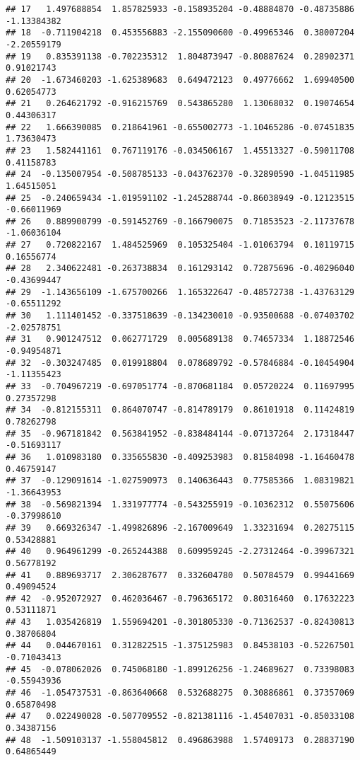 \documentclass[
]{article}
\begin{document}
\begin{verbatim}
## 17   1.497688854  1.857825933 -0.158935204 -0.48884870 -0.48735886 -1.13384382
## 18  -0.711904218  0.453556883 -2.155090600 -0.49965346  0.38007204 -2.20559179
## 19   0.835391138 -0.702235312  1.804873947 -0.80887624  0.28902371  0.91021743
## 20  -1.673460203 -1.625389683  0.649472123  0.49776662  1.69940500  0.62054773
## 21   0.264621792 -0.916215769  0.543865280  1.13068032  0.19074654  0.44306317
## 22   1.666390085  0.218641961 -0.655002773 -1.10465286 -0.07451835  1.73630473
## 23   1.582441161  0.767119176 -0.034506167  1.45513327 -0.59011708  0.41158783
## 24  -0.135007954 -0.508785133 -0.043762370 -0.32890590 -1.04511985  1.64515051
## 25  -0.240659434 -1.019591102 -1.245288744 -0.86038949 -0.12123515 -0.66011969
## 26   0.889900799 -0.591452769 -0.166790075  0.71853523 -2.11737678 -1.06036104
## 27   0.720822167  1.484525969  0.105325404 -1.01063794  0.10119715  0.16556774
## 28   2.340622481 -0.263738834  0.161293142  0.72875696 -0.40296040 -0.43699447
## 29  -1.143656109 -1.675700266  1.165322647 -0.48572738 -1.43763129 -0.65511292
## 30   1.111401452 -0.337518639 -0.134230010 -0.93500688 -0.07403702 -2.02578751
## 31   0.901247512  0.062771729  0.005689138  0.74657334  1.18872546 -0.94954871
## 32  -0.303247485  0.019918804  0.078689792 -0.57846884 -0.10454904 -1.11355423
## 33  -0.704967219 -0.697051774 -0.870681184  0.05720224  0.11697995  0.27357298
## 34  -0.812155311  0.864070747 -0.814789179  0.86101918  0.11424819  0.78262798
## 35  -0.967181842  0.563841952 -0.838484144 -0.07137264  2.17318447 -0.51693117
## 36   1.010983180  0.335655830 -0.409253983  0.81584098 -1.16460478  0.46759147
## 37  -0.129091614 -1.027590973  0.140636443  0.77585366  1.08319821 -1.36643953
## 38  -0.569821394  1.331977774 -0.543255919 -0.10362312  0.55075606 -0.37998610
## 39   0.669326347 -1.499826896 -2.167009649  1.33231694  0.20275115  0.53428881
## 40   0.964961299 -0.265244388  0.609959245 -2.27312464 -0.39967321  0.56778192
## 41   0.889693717  2.306287677  0.332604780  0.50784579  0.99441669  0.49094524
## 42  -0.952072927  0.462036467 -0.796365172  0.80316460  0.17632223  0.53111871
## 43   1.035426819  1.559694201 -0.301805330 -0.71362537 -0.82430813  0.38706804
## 44   0.044670161  0.312822515 -1.375125983  0.84538103 -0.52267501 -0.71043413
## 45  -0.078062026  0.745068180 -1.899126256 -1.24689627  0.73398083 -0.55943936
## 46  -1.054737531 -0.863640668  0.532688275  0.30886861  0.37357069  0.65870498
## 47   0.022490028 -0.507709552 -0.821381116 -1.45407031 -0.85033108  0.34387156
## 48  -1.509103137 -1.558045812  0.496863988  1.57409173  0.28837190  0.64865449

\end{verbatim}
\end{document}
